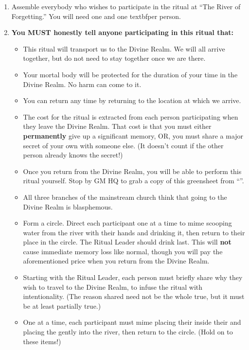 \documentclass[green]{GL2020}
\begin{document}
\begin{enumerate}
    \item Assemble everybody who wishes to participate in the ritual at ``The River of Forgetting.'' You will need one \iGlassVial{} and one \iRitualCandle{} textbf{per person}.
    \item \textbf{You MUST honestly tell anyone participating in this ritual that:}
    \begin{itemize}
        \item This ritual will transport us to the Divine Realm. We will all arrive together, but do not need to stay together once we are there.
        \item Your mortal body will be protected for the duration of your time in the Divine Realm. No harm can come to it.
        \item You can return any time by returning to the location at which we arrive.
        \item The cost for the ritual is extracted from each person participating when they leave the Divine Realm. That cost is that you must either \textbf{permanently} give up a significant memory, OR, you must share a major secret of your own with someone else. (It doesn't count if the other person already knows the secret!)
        \item Once you return from the Divine Realm, you will be able to perform this ritual yourself. Stop by GM HQ to grab a copy of this greensheet from ``\sSignG{}''.
        \item All three branches of the mainstream church think that going to the Divine Realm is blasphemous.
    \end{itemize}
    \begin{itemize}
        \item Form a circle. Direct each participant one at a time to mime scooping water from the river with their hands and drinking it, then return to their place in the circle. The Ritual Leader should drink last. This will \textbf{not} cause immediate memory loss like normal, though you will pay the aforementioned price when you return from the Divine Realm.
        \item Starting with the Ritual Leader, each person must briefly share why they wish to travel to the Divine Realm, to infuse the ritual with intentionality. (The reason shared need not be the whole true, but it must be at least partially true.)
        \item One at a time, each participant must mime placing their \iRitualCandle{} inside their \iGlassVial{} and placing the \iGlassVial{} gently into the river, then return to the circle. (Hold on to these items!)

\end{itemize}
\end{enumerate}
\end{document}
